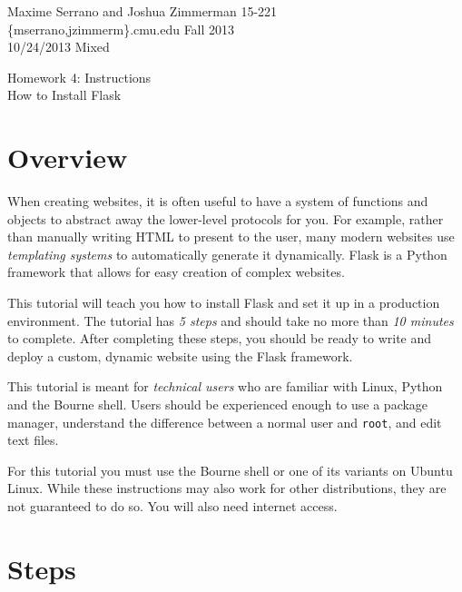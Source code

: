 \documentclass{article}
\title{} \date{}
\begin{document}
\noindent Maxime Serrano and Joshua Zimmerman \hfill 15-221 \\
\{mserrano,jzimmerm\}\@andrew.cmu.edu \hfill Fall 2013 \\
10/24/2013 \hfill Mixed \\
\begin{center}
Homework 4: Instructions \\
\vspace{10 mm}
{\huge How to Install Flask}
\end{center}
\pagebreak

\section{Overview}
When creating websites, it is often useful to have a system of functions and objects
to abstract away the lower-level protocols for you. For example, rather than manually
writing HTML to present to the user, many modern websites use {\em templating systems}
to automatically generate it dynamically. Flask is a Python framework that allows
for easy creation of complex websites.

This tutorial will teach you how to install Flask and set it up in a production environment.
The tutorial has {\em 5 steps} and should take no more than {\em 10 minutes} to complete.
After completing these steps, you should be ready to write and deploy a custom, dynamic
website using the Flask framework.

This tutorial is meant for {\em technical users} who are familiar with Linux, Python and
the Bourne shell. Users should be experienced enough to use a package manager, understand
the difference between a normal user and \texttt{root}, and edit text files.

For this tutorial you must use the Bourne shell or one of its variants on Ubuntu Linux.
While these instructions may also work for other distributions, they are not guaranteed
to do so. You will also need internet access.

\pagebreak

\section{Steps}
\end{document}
